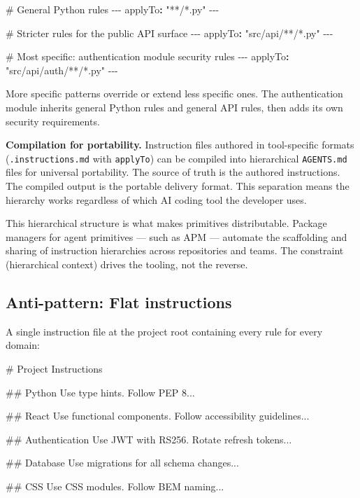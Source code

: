 \documentclass[
  a4paper,
  DIV=11,
  numbers=noendperiod]{scrreprt}
\newenvironment{Shaded}{\begin{snugshade}}{\end{snugshade}}
\newcommand{\AttributeTok}[1]{\textcolor[rgb]{0.40,0.45,0.13}{#1}}
\newcommand{\CommentTok}[1]{\textcolor[rgb]{0.37,0.37,0.37}{#1}}
\newcommand{\FunctionTok}[1]{\textcolor[rgb]{0.28,0.35,0.67}{#1}}
\newcommand{\KeywordTok}[1]{\textcolor[rgb]{0.00,0.23,0.31}{\textbf{#1}}}
\newcommand{\NormalTok}[1]{\textcolor[rgb]{0.00,0.23,0.31}{#1}}
\newcommand{\PreprocessorTok}[1]{\textcolor[rgb]{0.68,0.00,0.00}{#1}}
\newcommand{\StringTok}[1]{\textcolor[rgb]{0.13,0.47,0.30}{#1}}
\begin{document}
\begin{Shaded}
\begin{Highlighting}[]
\CommentTok{\# General Python rules}
\PreprocessorTok{{-}{-}{-}}
\FunctionTok{applyTo}\KeywordTok{:}\AttributeTok{ }\StringTok{"**/*.py"}
\PreprocessorTok{{-}{-}{-}}

\CommentTok{\# Stricter rules for the public API surface}
\PreprocessorTok{{-}{-}{-}}
\FunctionTok{applyTo}\KeywordTok{:}\AttributeTok{ }\StringTok{"src/api/**/*.py"}
\PreprocessorTok{{-}{-}{-}}

\CommentTok{\# Most specific: authentication module security rules}
\PreprocessorTok{{-}{-}{-}}
\FunctionTok{applyTo}\KeywordTok{:}\AttributeTok{ }\StringTok{"src/api/auth/**/*.py"}
\PreprocessorTok{{-}{-}{-}}
\end{Highlighting}
\end{Shaded}

More specific patterns override or extend less specific ones. The
authentication module inherits general Python rules and general API
rules, then adds its own security requirements.

\textbf{Compilation for portability.} Instruction files authored in
tool-specific formats (\texttt{.instructions.md} with \texttt{applyTo})
can be compiled into hierarchical \texttt{AGENTS.md} files for universal
portability. The source of truth is the authored instructions. The
compiled output is the portable delivery format. This separation means
the hierarchy works regardless of which AI coding tool the developer
uses.

This hierarchical structure is what makes primitives distributable.
Package managers for agent primitives --- such as APM --- automate the
scaffolding and sharing of instruction hierarchies across repositories
and teams. The constraint (hierarchical context) drives the tooling, not
the reverse.

\subsection{Anti-pattern: Flat
instructions}\label{anti-pattern-flat-instructions}

A single instruction file at the project root containing every rule for
every domain:

\begin{Shaded}
\begin{Highlighting}[]
\FunctionTok{\# Project Instructions}

\FunctionTok{\#\# Python}
\NormalTok{Use type hints. Follow PEP 8...}

\FunctionTok{\#\# React}
\NormalTok{Use functional components. Follow accessibility guidelines...}

\FunctionTok{\#\# Authentication}
\NormalTok{Use JWT with RS256. Rotate refresh tokens...}

\FunctionTok{\#\# Database}
\NormalTok{Use migrations for all schema changes...}

\FunctionTok{\#\# CSS}
\NormalTok{Use CSS modules. Follow BEM naming...}
\end{Highlighting}
\end{Shaded}
\end{document}
